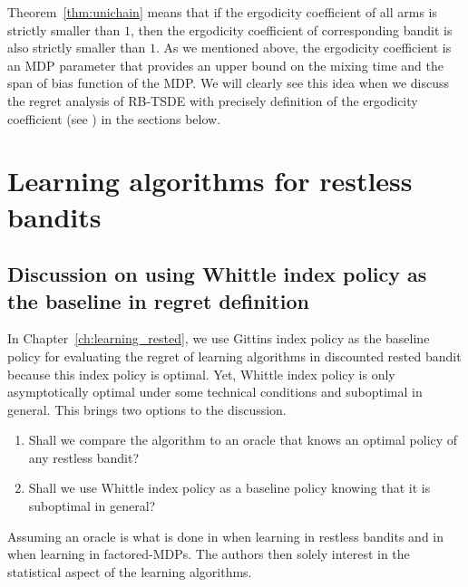 Theorem~\ref{thm:unichain} means that if the ergodicity coefficient of all arms is strictly smaller than $1$, then the ergodicity coefficient of corresponding bandit is also strictly smaller than $1$.
As we mentioned above, the ergodicity coefficient is an MDP parameter that provides an upper bound on the mixing time and the span of bias function of the MDP.
We will clearly see this idea when we discuss the regret analysis of RB-TSDE \cite{akbarzadeh2022learning} with precisely definition of the ergodicity coefficient (see ) in the sections below.

\section{Learning algorithms for restless bandits}
\label{ch:restless:sec:generic}

\subsection{Discussion on using Whittle index policy as the baseline in regret definition}
\label{ch:restless:discuss_policy}

In Chapter~\ref{ch:learning_rested}, we use Gittins index policy as the baseline policy for evaluating the regret of learning algorithms in discounted rested bandit because this index policy is optimal.
Yet, Whittle index policy is only asymptotically optimal under some technical conditions \cite{weber1990index} and suboptimal in general.
This brings two options to the discussion.
\begin{enumerate}[label=(\alph*)]
    \item Shall we compare the algorithm to an oracle that knows an optimal policy of any restless bandit?
    \item \label{it:second_baseline} Shall we use Whittle index policy as a baseline policy knowing that it is suboptimal in general?
\end{enumerate}

Assuming an oracle is what is done in \cite{ortner2012regret, jung2019thompson, wang2020restless} when learning in restless bandits and in \cite{osband2014near, rosenberg2020oracle, xu2020reinforcement} when learning in factored-MDPs.
The authors then solely interest in the statistical aspect of the learning algorithms.

